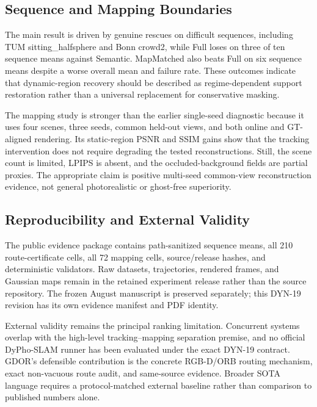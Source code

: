 \subsection{Sequence and Mapping Boundaries}

The main result is driven by genuine rescues on difficult sequences, including TUM sitting\_halfsphere and Bonn crowd2, while Full loses on three of ten sequence means against Semantic.
MapMatched also beats Full on six sequence means despite a worse overall mean and failure rate.
These outcomes indicate that dynamic-region recovery should be described as regime-dependent support restoration rather than a universal replacement for conservative masking.

The mapping study is stronger than the earlier single-seed diagnostic because it uses four scenes, three seeds, common held-out views, and both online and GT-aligned rendering.
Its static-region PSNR and SSIM gains show that the tracking intervention does not require degrading the tested reconstructions.
Still, the scene count is limited, LPIPS is absent, and the occluded-background fields are partial proxies.
The appropriate claim is positive multi-seed common-view reconstruction evidence, not general photorealistic or ghost-free superiority.

\subsection{Reproducibility and External Validity}

The public evidence package contains path-sanitized sequence means, all 210 route-certificate cells, all 72 mapping cells, source/release hashes, and deterministic validators.
Raw datasets, trajectories, rendered frames, and Gaussian maps remain in the retained experiment release rather than the source repository.
The frozen August manuscript is preserved separately; this DYN-19 revision has its own evidence manifest and PDF identity.

External validity remains the principal ranking limitation.
Concurrent systems overlap with the high-level tracking--mapping separation premise, and no official DyPho-SLAM runner has been evaluated under the exact DYN-19 contract.
GDOR's defensible contribution is the concrete RGB-D/ORB routing mechanism, exact non-vacuous route audit, and same-source evidence.
Broader SOTA language requires a protocol-matched external baseline rather than comparison to published numbers alone.
